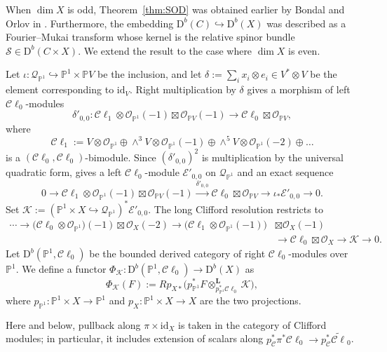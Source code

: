 \documentclass[12pt, letterpaper]{amsart}
\theoremstyle{definition}
\newcommand{\PP}{\mathbb{P} }
\newcommand{\cC}{\mathcal{C} }
\newcommand{\cE}{\mathcal{E} }
\newcommand{\cK}{\mathcal{K} }
\newcommand{\cO}{\mathcal{O} }
\newcommand{\cQ}{\mathcal{Q} }
\newcommand{\cS}{\mathcal{S} }
\newcommand{\rD}{\mathrm{D} }
\begin{document}
When \(\dim X\) is odd, Theorem~\ref{thm:SOD} was obtained earlier by Bondal and Orlov in \cite[Theorem~2.7]{BO95}. Furthermore, the embedding \(\rD^b(C) \hookrightarrow \rD^b(X)\) was described as a Fourier--Mukai transform whose kernel is the relative spinor bundle \(\cS \in \rD^b(C \times X)\). We extend the result to the case where \(\dim X\) is even.

Let \(\iota:\cQ_{\PP^1} \hookrightarrow \PP^1\times\PP V\) be the inclusion, and let \(\delta:=\sum_i x_i\otimes e_i\in V^*\otimes V\) be the element corresponding to \(\mathrm{id}_V\). Right multiplication by \(\delta\) gives a morphism of left \(\cC\ell_0\)-modules
\[\delta'_{0,0}: \cC\ell_1\otimes\cO_{\PP^1}(-1)\boxtimes\cO_{\PP V}(-1) \longrightarrow \cC\ell_0\boxtimes\cO_{\PP V},\]
where
\[\cC\ell_1 := V \otimes \cO_{\PP^1} \oplus \wedge^3 V \otimes \cO_{\PP^1}(-1) \oplus \wedge^5 V \otimes \cO_{\PP^1}(-2) \oplus \dots\]
is a \((\cC\ell_0, \cC\ell_0)\)-bimodule. Since \((\delta'_{0,0})^2\) is multiplication by the universal quadratic form, \cite[Lemma~4.5]{Kuz08} gives a left \(\cC\ell_0\)-module \(\cE'_{0,0}\) on \(\cQ_{\PP^1}\) and an exact sequence
\begin{equation}\label{eqn:E00prime}
0\to \cC\ell_1\otimes\cO_{\PP^1}(-1)\boxtimes\cO_{\PP V}(-1) \xrightarrow{\delta'_{0,0}} \cC\ell_0\boxtimes\cO_{\PP V} \to \iota_*\cE'_{0,0} \to 0.
\end{equation}
Set \(\cK:=(\PP^1\times X\hookrightarrow\cQ_{\PP^1})^*\cE'_{0,0}\). The long Clifford resolution \cite[(22)]{Kuz08} restricts to
\begin{align}\label{eqn:Kuznetsov_kernel_resolution}
\cdots\to\bigl(\cC\ell_0\otimes\cO_{\PP^1}\bigr)(-1)\boxtimes\cO_X(-2) \to\bigl(\cC\ell_1\otimes\cO_{\PP^1}(-1)\bigr)&\boxtimes\cO_X(-1) \\
&\to \cC\ell_0\boxtimes\cO_X \to \cK \to 0.\nonumber
\end{align}
Let \(\rD^b(\PP^1, \cC\ell_0)\) be the bounded derived category of right \(\cC\ell_0\)-modules over \(\PP^1\). We define a functor \(\Phi_{\cK} : \rD^b(\PP^1, \cC\ell_0) \to \rD^b(X)\) as
\[\Phi_{\cK}(F) := Rp_{X*} \bigl( p_{\PP^1}^*F \otimes_{p_{\PP^1}^*\cC\ell_0}^{\mathbf L} \cK \bigr),\]
where \(p_{\PP^1}:\PP^1\times X\to\PP^1\) and \(p_{X} :\PP^1\times X\to X\) are the two projections.

Here and below, pullback along \(\pi\times\mathrm{id}_X\) is taken in the category of Clifford modules; in particular, it includes extension of scalars along \(p_{\cC}^*\pi^*\cC\ell_0\to p_{\cC}^*\widetilde{\cC\ell}_0\).
\end{document}
